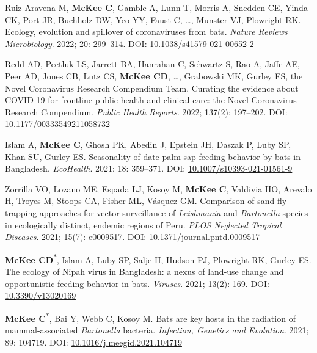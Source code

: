\documentclass{cv}
\begin{document}
\begin{pubenum}
\item Ruiz-Aravena M\textsuperscript{\dag}, \textbf{McKee C}\textsuperscript{\dag}, Gamble A, Lunn T, Morris A, Snedden CE, Yinda CK, Port JR, Buchholz DW, Yeo YY, Faust C, …, Munster VJ, Plowright RK. Ecology, evolution and spillover of coronaviruses from bats. \textit{Nature Reviews Microbiology}. 2022; 20: 299--314. DOI: \href{https://doi.org/10.1038/s41579-021-00652-2}{10.1038/s41579-021-00652-2}

\item Redd AD, Peetluk LS, Jarrett BA, Hanrahan C, Schwartz S, Rao A, Jaffe AE, Peer AD, Jones CB, Lutz CS, \textbf{McKee CD}, …, Grabowski MK, Gurley ES, the Novel Coronavirus Research Compendium Team. Curating the evidence about COVID-19 for frontline public health and clinical care: the Novel Coronavirus Research Compendium. \textit{Public Health Reports}. 2022; 137(2): 197--202. DOI: \href{https://doi.org/10.1177/00333549211058732}{10.1177/00333549211058732}

\item Islam A, \textbf{McKee C}, Ghosh PK, Abedin J, Epstein JH, Daszak P, Luby SP, Khan SU, Gurley ES. Seasonality of date palm sap feeding behavior by bats in Bangladesh. \textit{EcoHealth}. 2021; 18: 359--371. DOI: \href{https://doi.org/10.1007/s10393-021-01561-9}{10.1007/s10393-021-01561-9}

\item Zorrilla VO, Lozano ME, Espada LJ, Kosoy M, \textbf{McKee C}, Valdivia HO, Arevalo H, Troyes M, Stoops CA, Fisher ML, Vásquez GM. Comparison of sand fly trapping approaches for vector surveillance of \textit{Leishmania} and \textit{Bartonella} species in ecologically distinct, endemic regions of Peru. \textit{PLOS Neglected Tropical Diseases}. 2021; 15(7): e0009517. DOI: \href{https://doi.org/10.1371/journal.pntd.0009517}{10.1371/journal.pntd.0009517}

\item \textbf{McKee CD}\textsuperscript{*}, Islam A, Luby SP, Salje H, Hudson PJ, Plowright RK, Gurley ES. The ecology of Nipah virus in Bangladesh: a nexus of land-use change and opportunistic feeding behavior in bats. \textit{Viruses}. 2021; 13(2): 169. DOI: \href{https://doi.org/10.3390/v13020169}{10.3390/v13020169}

\item \textbf{McKee C}\textsuperscript{*}, Bai Y, Webb C, Kosoy M. Bats are key hosts in the radiation of mammal-associated \textit{Bartonella} bacteria. \textit{Infection, Genetics and Evolution}. 2021; 89: 104719. DOI: \href{https://doi.org/10.1016/j.meegid.2021.104719}{10.1016/j.meegid.2021.104719}


\end{pubenum}
\end{document}
